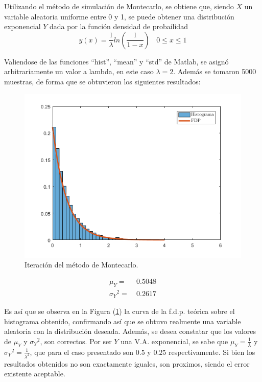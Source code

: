 



Utilizando el método de simulación de Montecarlo, se obtiene que, siendo $X$ un variable aleatoria uniforme entre 0 y 1, se puede obtener una distribución exponencial $Y$ dada por la función densidad de probailidad
\begin{equation}
	y(x) = \frac{1}{\lambda} ln\left( \frac{1}{1 - x} \right) \ \ \ \ 0 \leq x \leq 1
\end{equation}

Valiendose de las funciones ``hist'', ``mean'' y ``std'' de Matlab, se asignó arbitrariamente un valor a lambda, en este caso $\lambda = 2$. Además se tomaron 5000 muestras, de forma que se obtuvieron los siguientes resultados:
\begin{figure}[H]
	\centering
	\includegraphics[width=0.7\linewidth]{./ImagenesEjercicio1/Simu-1.png}
	\caption{Iteración del método de Montecarlo.}
	\label{fig:primerit}
\end{figure}

\begin{equation}
\begin{aligned}
		\mu_{Y} = & \ 0.5048 \\
		{\sigma_{Y}}^{2} = & \ 0.2617
\end{aligned}
\end{equation}

Es así que se observa en la Figura (\ref{fig:primerit}) la curva de la f.d.p. teórica sobre el histograma obtenido, confirmando así que se obtuvo realmente una variable aleatoria con la distribución deseada. Además, se desea constatar que los valores de $\mu_{Y}$ y ${\sigma_{Y}}^{2}$, son correctos. Por ser $Y$ una V.A. exponencial, se sabe que $\mu_{Y} = \frac{1}{\lambda}$ y ${\sigma_{Y}}^{2} = \frac{1}{\lambda^2}$, que para el caso presentado son $0.5$ y $0.25$ respectivamente. Si bien los resultados obtenidos no son exactamente iguales, son proximos, siendo el error existente aceptable.  

